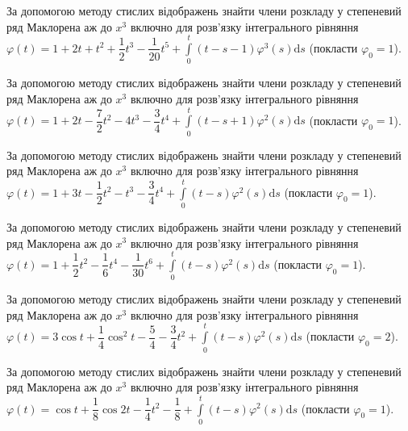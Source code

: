 \documentclass[12pt]{extarticle}
\begin{document}
\begin{Exercise}
За допомогою методу стислих відображень знайти члени розкладу у степеневий ряд Маклорена аж до $x^3$ включно для розв’язку інтегрального рівняння $\varphi (t) = 1 + 2t + t^2 + \dfrac{1}{2}t^3 - \dfrac{1}{20}t^5 +  \int\limits_{0}^{t} (t - s -  1)\varphi^3(s) \mathrm{d}s$ (покласти $\varphi_0 = 1$).
\end{Exercise}

\begin{Exercise}
За допомогою методу стислих відображень знайти члени розкладу у степеневий ряд Маклорена аж до $x^3$ включно для розв’язку інтегрального рівняння $\varphi (t) = 1 + 2t - \dfrac{7}{2} t^2 - 4 t^3 - \dfrac{3}{4} t^4 + \int\limits_{0}^{t} (t - s + 1)\varphi^2(s) \mathrm{d}s$ (покласти $\varphi_0 = 1$).
\end{Exercise}

\begin{Exercise}
За допомогою методу стислих відображень знайти члени розкладу у степеневий ряд Маклорена аж до $x^3$ включно для розв’язку інтегрального рівняння $\varphi (t) = 1 + 3t - \dfrac{1}{2} t^2 - t^3 - \dfrac{3}{4} t^4 + \int\limits_{0}^{t} (t - s) \varphi^2(s) \mathrm{d}s$ (покласти $\varphi_0 = 1$).
\end{Exercise}

\begin{Exercise}
За допомогою методу стислих відображень знайти члени розкладу у степеневий ряд Маклорена аж до $x^3$ включно для розв’язку інтегрального рівняння $\varphi (t) = 1 + \dfrac{1}{2} t^2 - \dfrac{1}{6} t^4 - \dfrac{1}{30} t^6 + \int\limits_{0}^{t} (t - s)\varphi^2(s) \mathrm{d}s$ (покласти $\varphi_0 = 1$).
\end{Exercise}

\begin{Exercise}
За допомогою методу стислих відображень знайти члени розкладу у степеневий ряд Маклорена аж до $x^3$ включно для розв’язку інтегрального рівняння $\varphi (t) = 3 \cos t + \dfrac{1}{4} \cos^2 t - \dfrac{5}{4} - \dfrac{3}{4} t^2 + \int\limits_{0}^{t} (t - s)\varphi^2(s) \mathrm{d}s$ (покласти $\varphi_0 = 2$).
\end{Exercise}

\begin{Exercise}
За допомогою методу стислих відображень знайти члени розкладу у степеневий ряд Маклорена аж до $x^3$ включно для розв’язку інтегрального рівняння $\varphi (t) = \cos t + \dfrac{1}{8} \cos 2t - \dfrac{1}{4} t^2 - \dfrac{1}{8} + \int\limits_{0}^{t} (t-s) \varphi^2(s) \mathrm{d}s$ (покласти $\varphi_0 = 1$).
\end{Exercise}
\end{document}

